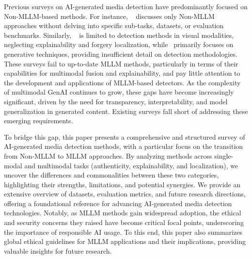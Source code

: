 Previous surveys on AI-generated media detection have predominantly focused on Non-MLLM-based methods. For instance, ~\cite{lin2024detecting} discusses only Non-MLLM approaches without delving into specific sub-tasks, datasets, or evaluation benchmarks. Similarly, ~\cite{deng2024survey} is limited to detection methods in visual modalities, neglecting explainability and forgery localization, while~\cite{yu2024fake} primarily focuses on generative techniques, providing insufficient detail on detection methodologies. These surveys fail to up-to-date MLLM methods, particularly in terms of their capabilities for multimodal fusion and explainability, and pay little attention to the development and applications of MLLM-based detectors. As the complexity of multimodal GenAI continues to grow, these gaps have become increasingly significant, driven by the need for transparency, interpretability, and model generalization in generated content. Existing surveys fall short of addressing these emerging requirements.

To bridge this gap, this paper presents a comprehensive and structured survey of AI-generated media detection methods, with a particular focus on the transition from Non-MLLM to MLLM approaches. By analyzing methods across single-modal and multimodal tasks (authenticity, explainability, and localization), we uncover the differences and commonalities between these two categories, highlighting their strengths, limitations, and potential synergies. We provide an extensive overview of datasets, evaluation metrics, and future research directions, offering a foundational reference for advancing AI-generated media detection technologies. Notably, as MLLM methods gain widespread adoption, the ethical and security concerns they raised have become critical focal points, underscoring the importance of responsible AI usage. To this end, this paper also summarizes global ethical guidelines for MLLM applications and their implications, providing valuable insights for future research.

